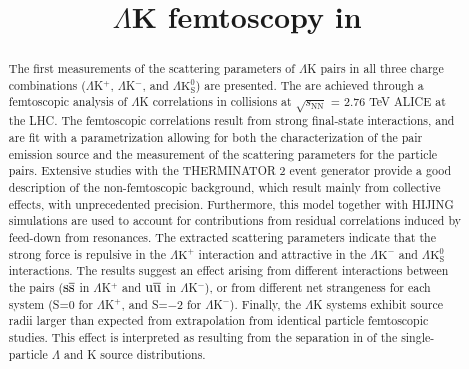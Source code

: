 \documentclass[ALICE,manyauthors]{cernphprep}
\newcommand{\LamK}{$\Lambda$K\xspace}
\newcommand{\LamKchP}{$\Lambda\mathrm{K^{+}}$\xspace}
\newcommand{\LamKchM}{$\Lambda\mathrm{K^{-}}$\xspace}
\newcommand{\LamKs}{$\Lambda\mathrm{K^{0}_{S}}$\xspace}
\begin{document}
%

\begin{titlepage}
%
%

\title{\LamK femtoscopy in {} {}}
\ShortTitle{\LamK femtoscopy in {\color{red}{Pb-Pb}} {\color{blue}{Pb--Pb}} collisions}   %


\begin{abstract}
The first measurements of the scattering parameters of $\Lambda$K pairs in all three charge combinations ($\Lambda$K$^{+}$, $\Lambda$K$^{-}$, and $\Lambda\mathrm{K^{0}_{S}}$) are presented.
The {\color{red}{measurements}} {\color{blue}{results}} are achieved through a femtoscopic analysis of $\Lambda$K correlations in {\color{red}{Pb-Pb}} {\color{blue}{Pb--Pb}} collisions at $\sqrt{s_{\mathrm{NN}}}$ = 2.76 TeV {\color{red}{from}} {\color{blue}{recorded by}} ALICE at the LHC.  
The femtoscopic correlations result from strong final-state interactions, and are fit with a parametrization allowing for both the characterization of the pair emission source and the measurement of the scattering parameters for the particle pairs.
Extensive studies with the THERMINATOR 2 event generator provide a good description of the non-femtoscopic background, which result mainly from collective effects, with unprecedented precision.
Furthermore, this model together with HIJING simulations are used to account for contributions from residual correlations induced by feed-down from resonances.
The extracted scattering parameters indicate that the strong force is repulsive in the \LamKchP interaction and attractive in the \LamKchM and \LamKs interactions.
The results suggest an effect arising from different {\color{red}{quark-antiquark}} {\color{blue}{quark--antiquark}} interactions between the pairs ($\rm s\overline{s}$ in $\Lambda$K$^{+}$ and $\rm u\overline{u}$ in $\Lambda$K$^{-}$), or from different net strangeness for each system (S=0 for $\Lambda$K$^{+}$, and S=$-2$ for $\Lambda$K$^{-}$).
Finally, the $\Lambda$K systems exhibit source radii larger than expected from extrapolation from identical particle femtoscopic studies.
This effect is interpreted as resulting from the separation in {\color{red}{space-time}} {\color{blue}{space--time}} of the single-particle $\Lambda$ and K source distributions.
\end{abstract}
\end{titlepage}
\end{document}
